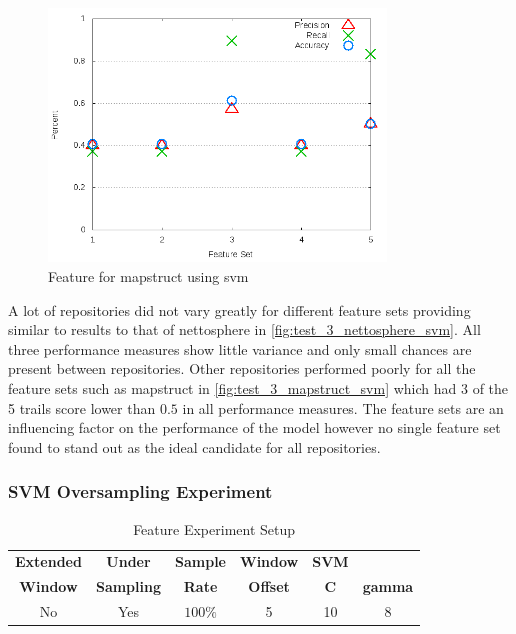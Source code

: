 \begin{figure}[!ht]
    \centering
        \includegraphics[width=0.8\textwidth]{images/svm/test_3/mapstruct_sample_range}
        \caption{Feature for mapstruct using \gls{svm}}
        \label{fig:test_3_mapstruct_svm}
\end{figure}

A lot of repositories did not vary greatly for different feature sets providing similar to results to that of nettosphere in \autoref{fig:test_3_nettosphere_svm}. All three performance measures show little variance and only small chances are present between repositories. Other repositories performed poorly for all the feature sets such as mapstruct in \autoref{fig:test_3_mapstruct_svm} which had 3 of the 5 trails score lower than $0.5$ in all performance measures. The feature sets are an influencing factor on the performance of the model however no single feature set found to stand out as the ideal candidate for all repositories.

\subsubsection{SVM Oversampling Experiment}
\label{sec:svm_os_experiment}

\begin{table}[h]
\begin{center}

    \begin{tabular}{|c|c|c|c|cc|}
        \hline
        \textbf{Extended} & \textbf{Under} & \textbf{Sample} & \textbf{Window} & \textbf{SVM} & \\
        \textbf{Window} & \textbf{Sampling} & \textbf{Rate} & \textbf{Offset} &  \textbf{C} & \textbf{gamma} \\ \hline
        No & Yes & $100\%$ & 5 & 10 & 8 \\ \hline
    \end{tabular}
    \caption{Feature Experiment Setup}
    \label{tab:rf_feature_experiment_3_setup}
\end{center}

\end{table}


